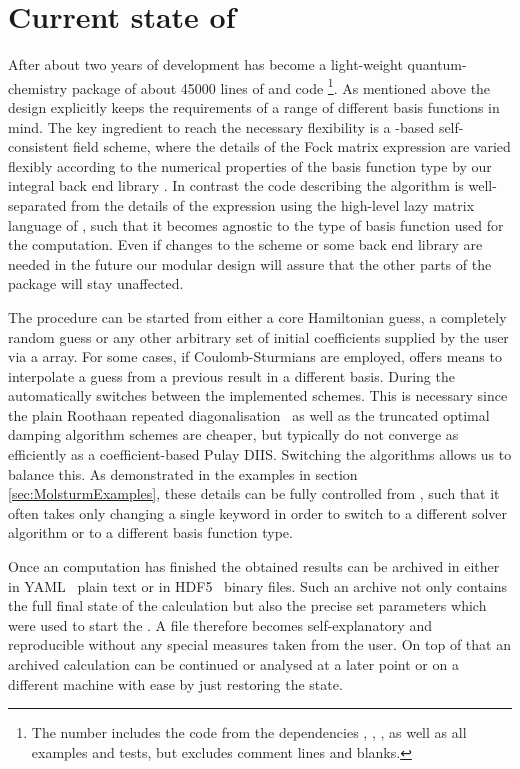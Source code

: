 \section{Current state of \molsturm}
\label{sec:MolsturmState}

After about two years of development
\molsturm has become a light-weight quantum-chemistry package of about 45000
lines of \cpp and \python code%
\footnote{The number includes the code from the dependencies
\gint, \gscf, \lazyten, \krims as well as
all examples and tests, but excludes comment lines and blanks.}.
As mentioned above the design explicitly keeps the requirements of a range of
different basis functions in mind.
The key ingredient to reach the necessary flexibility
is a \contraction-based self-consistent field scheme,
where the details of the Fock matrix \contraction expression
are varied flexibly according to the numerical properties of the basis function type
by our integral back end library \gint.
In contrast
the code describing the \SCF algorithm
is well-separated from the details of the \contraction expression
using the high-level lazy matrix language of \lazyten,
such that it becomes agnostic to the type of basis function used for the computation.
Even if changes to the \SCF scheme or some back end
library are needed in the future our modular design
will assure that the other parts of the \molsturm package will stay unaffected.

The \SCF procedure can be started from either a core Hamiltonian guess,
a completely random guess or any other arbitrary set of initial
coefficients supplied by the user via a \numpy array.
For some cases, \eg if Coulomb-Sturmians are employed,
\molsturm offers means to interpolate a guess from a previous result
in a different basis.
During the \SCF \molsturm automatically switches between
the implemented \SCF schemes.
This is necessary since the plain Roothaan
repeated diagonalisation~\cite{Roothaan1951}
as well as the truncated optimal damping algorithm schemes
are cheaper, but typically do not converge as efficiently
as a coefficient-based Pulay DIIS.
Switching the algorithms allows us to balance this.
As demonstrated in the examples in section \ref{sec:MolsturmExamples},
these details can be fully controlled from \python,
such that it often takes only changing a single keyword
in order to switch to a different solver algorithm or to a different
basis function type.

Once an \SCF computation has finished the obtained results can be archived
in either in YAML~\cite{Ben-Kiki2009} plain text or in HDF5~\cite{HDF5Manual}
binary files.
Such an archive not only contains the full final state of the calculation
but also the precise set parameters which were used to start the \SCF.
A file therefore becomes self-explanatory and reproducible
without any special measures taken from the user.
On top of that an archived calculation can be continued
or analysed at a later point or on a different machine with ease
by just restoring the state.

